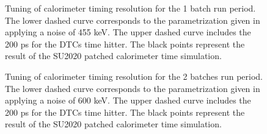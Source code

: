 \begin{figure}[h]
  \hspace{-0.6in}
  \caption{
    \label{fig:calorimeter_timing_resolution_1batch}
    Tuning of calorimeter timing resolution for the 1 batch run period. The lower dashed curve corresponds to the parametrization given in \cite{MU2E_36225_CALO_TIME_RES} applying a noise of 455 keV. The upper dashed curve includes the 200 ps for the DTCs time hitter. The black points represent the result of the SU2020 patched calorimeter time simulation.
  }
\end{figure}

\begin{figure}[h]
  \hspace{-0.6in}
  \caption{
    \label{fig:calorimeter_timing_resolution_2batch}
    Tuning of calorimeter timing resolution for the 2 batches run period. The lower dashed curve corresponds to the parametrization given in \cite{MU2E_36225_CALO_TIME_RES} applying a noise of 600 keV. The upper dashed curve includes the 200 ps for the DTCs time hitter. The black points represent the result of the SU2020 patched calorimeter time simulation. 
  }
\end{figure}
